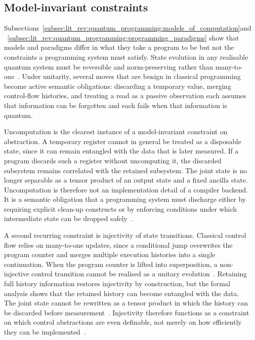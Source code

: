 \subsection{Model-invariant constraints}\label{subsec:lit_rev:quantum_programming:model_invariant_constraints}
Subsections~\ref{subsec:lit_rev:quantum_programming:models_of_computation}and~\ref{subsec:lit_rev:quantum_programming:programming_paradigms} show that models and paradigms differ in what they take a program to be but not the constraints a programming system must satisfy.
State evolution in any realisable quantum system must be reversible and norm-preserving rather than many-to-one~\cite{yuan2025foundationalabstractions}.
Under unitarity, several moves that are benign in classical programming become active semantic obligations: discarding a temporary value, merging control-flow histories, and treating a read as a passive observation each assumes that information can be forgotten and each fails when that information is quantum.

Uncomputation is the clearest instance of a model-invariant constraint on abstraction.
A temporary register cannot in general be treated as a disposable state, since it can remain entangled with the data that is later measured.
If a program discards such a register without uncomputing it, the discarded subsystem remains correlated with the retained subsystem.
The joint state is no longer separable as a tensor product of an output state and a fixed ancilla state.
Uncomputation is therefore not an implementation detail of a compiler backend.
It is a semantic obligation that a programming system must discharge either by requiring explicit clean-up constructs or by enforcing conditions under which intermediate state can be dropped safely~\cite{bichsel2020silq}.

A second recurring constraint is injectivity of state transitions.
Classical control flow relies on many-to-one updates, since a conditional jump overwrites the program counter and merges multiple execution histories into a single continuation.
When the program counter is lifted into superposition, a non-injective control transition cannot be realised as a unitary evolution~\cite{yuan2025foundationalabstractions}.
Retaining full history information restores injectivity by construction, but the formal analysis shows that the retained history can become entangled with the data.
The joint state cannot be rewritten as a tensor product in which the history can be discarded before measurement~\cite{yuan2025foundationalabstractions}.
Injectivity therefore functions as a constraint on which control abstractions are even definable, not merely on how efficiently they can be implemented~\cite{yuan2025foundationalabstractions}.

